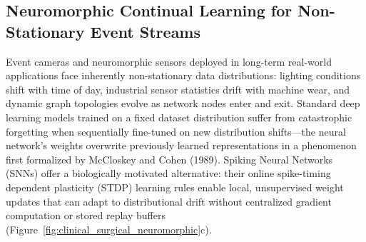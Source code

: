 
\subsection{Neuromorphic Continual Learning for Non-Stationary Event Streams}
\label{sec:neuromorphic_continual}

Event cameras and neuromorphic sensors deployed in long-term real-world applications face inherently non-stationary data distributions: lighting conditions shift with time of day, industrial sensor statistics drift with machine wear, and dynamic graph topologies evolve as network nodes enter and exit. Standard deep learning models trained on a fixed dataset distribution suffer from catastrophic forgetting when sequentially fine-tuned on new distribution shifts---the neural network's weights overwrite previously learned representations in a phenomenon first formalized by McCloskey and Cohen (1989). Spiking Neural Networks (SNNs) offer a biologically motivated alternative: their online spike-timing dependent plasticity (STDP) learning rules enable local, unsupervised weight updates that can adapt to distributional drift without centralized gradient computation or stored replay buffers (Figure~\ref{fig:clinical_surgical_neuromorphic}c).

